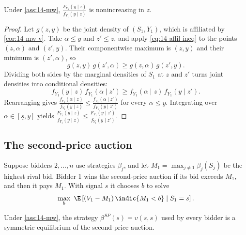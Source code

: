 \begin{lemma}\label{lem:14-mw-lemma1}
Under \cref{ass:14-mw}, $\frac{F_{Y_1}(y\mid z)}{f_{Y_1}(y\mid z)}$ is nonincreasing in $z$.
\end{lemma}

\begin{proof}
Let $g(z,y)$ be the joint density of $(S_1,Y_1)$, which is affiliated by \cref{cor:14-mw-v}. Take
$\alpha\le y$ and $z'\le z$, and apply \eqref{eq:14-affil-ineq} to the points $(z,\alpha)$ and $(z',y)$.
Their componentwise maximum is $(z,y)$ and their minimum is $(z',\alpha)$, so
\begin{equation*}
  g(z,y)\,g(z',\alpha)\ge g(z,\alpha)\,g(z',y).
\end{equation*}
Dividing both sides by the marginal densities of $S_1$ at $z$ and $z'$ turns joint densities into
conditional densities:
\begin{equation*}
  f_{Y_1}(y\mid z)\,f_{Y_1}(\alpha\mid z')\ge f_{Y_1}(\alpha\mid z)\,f_{Y_1}(y\mid z').
\end{equation*}
Rearranging gives
$\frac{f_{Y_1}(\alpha\mid z)}{f_{Y_1}(y\mid z)}\le\frac{f_{Y_1}(\alpha\mid z')}{f_{Y_1}(y\mid z')}$ for
every $\alpha\le y$. Integrating over $\alpha\in[\underline s,y]$ yields
$\frac{F_{Y_1}(y\mid z)}{f_{Y_1}(y\mid z)}\le\frac{F_{Y_1}(y\mid z')}{f_{Y_1}(y\mid z')}$.
\end{proof}

\subsection{The second-price auction}\label{sec:14-mw-spa}

Suppose bidders $2,\dots,n$ use strategies $\beta_j$, and let $M_1=\max_{j\ne1}\beta_j(S_j)$ be the highest
rival bid. Bidder 1 wins the second-price auction if its bid exceeds $M_1$, and then it pays $M_1$. With
signal $s$ it chooses $b$ to solve
\begin{equation*}
  \max_b\ \E\left[(V_1-M_1)\,\indic\{M_1<b\}\mid S_1=s\right].
\end{equation*}

\begin{proposition}\label{prop:14-mw-spa}
Under \cref{ass:14-mw}, the strategy $\beta^{SP}(s)=v(s,s)$ used by every bidder is a symmetric equilibrium
of the second-price auction.
\end{proposition}

